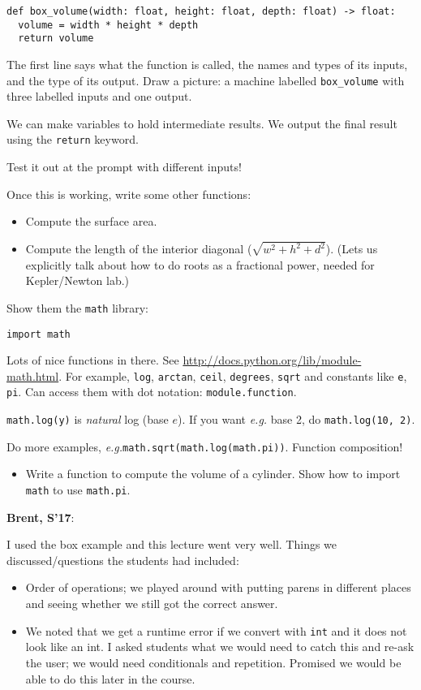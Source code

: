 \documentclass{article}
\newcommand{\eg}{\emph{e.g.}\xspace}
\newenvironment{reflect}[1]
{
  \noindent
  \begin{lrbox}{\reflectbox}
    \begin{minipage}[t]{\textwidth}
      \textbf{#1}:
}{
    \end{minipage}
  \end{lrbox}
  \fbox{\usebox{\reflectbox}}
}
\begin{document}
\begin{verbatim}
def box_volume(width: float, height: float, depth: float) -> float:
  volume = width * height * depth
  return volume
\end{verbatim}

The first line says what the function is called, the names and types
of its inputs, and the type of its output.  Draw a picture: a machine
labelled \verb|box_volume| with three labelled inputs and one
output.

We can make variables to hold intermediate results.  We output the
final result using the \verb|return| keyword.

Test it out at the prompt with different inputs!

Once this is working, write some other functions:
\begin{itemize}
\item Compute the surface area.
\item Compute the length of the interior diagonal
  ($\sqrt{w^2 + h^2 + d^2}$).  (Lets us explicitly talk about how to do
  roots as a fractional power, needed for Kepler/Newton lab.)
\end{itemize}

Show them the \verb|math| library:

\begin{verbatim}
import math
\end{verbatim}

Lots of nice functions in there.  See
\url{http://docs.python.org/lib/module-math.html}.  For example,
\verb|log|, \verb|arctan|, \verb|ceil|, \verb|degrees|, \verb|sqrt|
and constants like \verb|e|, \verb|pi|.  Can access them with dot
notation: \verb|module.function|.

\verb|math.log(y)| is \emph{natural} log (base $e$). If you want
\eg base 2, do \verb|math.log(10, 2)|.

Do more examples, \eg \verb|math.sqrt(math.log(math.pi))|.  Function
composition!

\begin{itemize}
\item Write a function to compute the volume of a cylinder.  Show how
  to import \texttt{math} to use \texttt{math.pi}.
\end{itemize}

\begin{reflect}{Brent, S'17}
  I used the box example and this lecture went very well.  Things we
  discussed/questions the students had included:

  \begin{itemize}
  \item Order of operations; we played around with putting parens in
    different places and seeing whether we still got the correct
    answer.
  \item We noted that we get a runtime error if we convert with
    \verb|int| and it does not look like an int.  I asked students
    what we would need to catch this and re-ask the user; we would
    need conditionals and repetition.  Promised we would be able to do
    this later in the course.
  \end{itemize}
\end{reflect}
\end{document}
